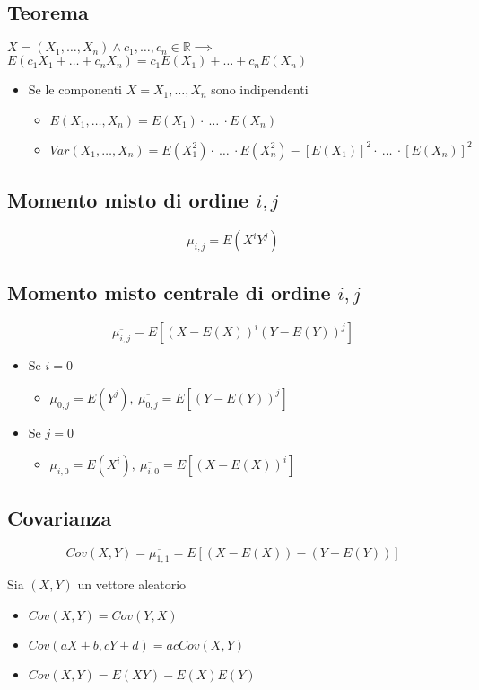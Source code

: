 \subsection*{Teorema}
$X = (X_1,\dots,X_n) \land c_1,\dots,c_n \in \mathbb{R} \implies$
$E(c_1 X_1 + \dots + c_n X_n) = c_1 E(X_1) + \dots + c_n E(X_n)$
\begin{itemize}
    \item Se le componenti $X = X_1, \dots, X_n$ sono indipendenti
    \begin{itemize}
        \item $E(X_1,\dots,X_n) = E(X_1) \cdot \ \dots \ \cdot E(X_n)$
        \item $\mathit{Var}(X_1,\dots,X_n) = E(X_1^2) \cdot \ \dots \ \cdot E(X_n^2)
        - [E(X_1)]^2 \cdot \ \dots \ \cdot [E(X_n)]^2
        $
    \end{itemize}
\end{itemize}

\subsection*{Momento misto di ordine $i,j$}
$$
\mu_{i,j} = E(X^i Y^j)
$$

\subsection*{Momento misto centrale di ordine $i,j$}
$$
\overline{\mu_{i,j}} = E[(X- E(X))^i (Y - E(Y))^j]
$$
\begin{itemize}
    \item Se $i = 0$
    \begin{itemize}
        \item $\mu_{0,j} = E(Y^j), \ \overline{\mu_{0,j}} = E[(Y - E(Y))^j]$
    \end{itemize}
    \item Se $j = 0$
    \begin{itemize}
        \item $\mu_{i,0} = E(X^i), \ \overline{\mu_{i,0}} = E[(X - E(X))^i]$
    \end{itemize}
\end{itemize}

\subsection*{Covarianza}
$$
\mathit{Cov}(X,Y) = \overline{\mu_{1,1}} = E[(X - E(X)) - (Y - E(Y))]
$$
 
Sia $(X,Y)$ un vettore aleatorio
\begin{itemize}
    \item $\mathit{Cov}(X,Y) = \mathit{Cov}(Y,X)$
    \item $\mathit{Cov}(aX + b, cY + d) = ac \mathit{Cov}(X,Y)$
    \item $\mathit{Cov}(X,Y) = E(XY) - E(X)E(Y)$
\end{itemize}

